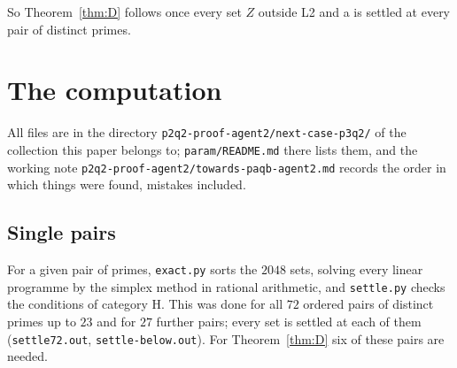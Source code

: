 \documentclass[11pt,a4paper]{amsart}
\theoremstyle{definition}
\theoremstyle{remark}
\newcommand{\file}[1]{\texttt{#1}}
\begin{document}
So Theorem~\ref{thm:D} follows once every set $Z$ outside L2 and a is settled at every pair of distinct primes.

\section{The computation}\label{sec:cert}

All files are in the directory \file{p2q2-proof-agent2/next-case-p3q2/} of the collection this paper belongs to;
\file{param/README.md} there lists them, and the working note \file{p2q2-proof-agent2/towards-paqb-agent2.md}
records the order in which things were found, mistakes included.

\subsection{Single pairs} For a given pair of primes, \file{exact.py} sorts the $2048$ sets, solving every
linear programme by the simplex method in rational arithmetic, and \file{settle.py} checks the conditions of
category H. This was done for all $72$ ordered pairs of distinct primes up to $23$ and for $27$ further pairs;
every set is settled at each of them (\file{settle72.out}, \file{settle-below.out}). For Theorem~\ref{thm:D} six
of these pairs are needed.
\end{document}
